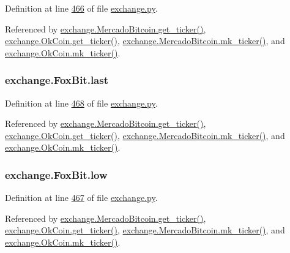 Definition at line \hyperlink{exchange_8py_source_l00466}{466} of file \hyperlink{exchange_8py_source}{exchange.\+py}.



Referenced by \hyperlink{exchange_8py_source_l00535}{exchange.\+Mercado\+Bitcoin.\+get\+\_\+ticker()}, \hyperlink{exchange_8py_source_l00600}{exchange.\+Ok\+Coin.\+get\+\_\+ticker()}, \hyperlink{exchange_8py_source_l00549}{exchange.\+Mercado\+Bitcoin.\+mk\+\_\+ticker()}, and \hyperlink{exchange_8py_source_l00614}{exchange.\+Ok\+Coin.\+mk\+\_\+ticker()}.

\subsubsection[{\texorpdfstring{last}{last}}]{\setlength{\rightskip}{0pt plus 5cm}exchange.\+Fox\+Bit.\+last}\hypertarget{classexchange_1_1_fox_bit_a5cdbc327b005014dc3b8bb6fb54a12fd}{}\label{classexchange_1_1_fox_bit_a5cdbc327b005014dc3b8bb6fb54a12fd}


Definition at line \hyperlink{exchange_8py_source_l00468}{468} of file \hyperlink{exchange_8py_source}{exchange.\+py}.



Referenced by \hyperlink{exchange_8py_source_l00535}{exchange.\+Mercado\+Bitcoin.\+get\+\_\+ticker()}, \hyperlink{exchange_8py_source_l00600}{exchange.\+Ok\+Coin.\+get\+\_\+ticker()}, \hyperlink{exchange_8py_source_l00549}{exchange.\+Mercado\+Bitcoin.\+mk\+\_\+ticker()}, and \hyperlink{exchange_8py_source_l00614}{exchange.\+Ok\+Coin.\+mk\+\_\+ticker()}.

\subsubsection[{\texorpdfstring{low}{low}}]{\setlength{\rightskip}{0pt plus 5cm}exchange.\+Fox\+Bit.\+low}\hypertarget{classexchange_1_1_fox_bit_acd666444cff98fe477651120ddb0f915}{}\label{classexchange_1_1_fox_bit_acd666444cff98fe477651120ddb0f915}


Definition at line \hyperlink{exchange_8py_source_l00467}{467} of file \hyperlink{exchange_8py_source}{exchange.\+py}.



Referenced by \hyperlink{exchange_8py_source_l00535}{exchange.\+Mercado\+Bitcoin.\+get\+\_\+ticker()}, \hyperlink{exchange_8py_source_l00600}{exchange.\+Ok\+Coin.\+get\+\_\+ticker()}, \hyperlink{exchange_8py_source_l00549}{exchange.\+Mercado\+Bitcoin.\+mk\+\_\+ticker()}, and \hyperlink{exchange_8py_source_l00614}{exchange.\+Ok\+Coin.\+mk\+\_\+ticker()}.

